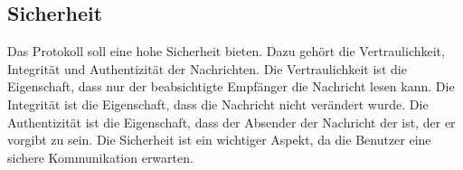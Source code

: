 \subsection{Sicherheit}

Das Protokoll soll eine hohe Sicherheit bieten. Dazu gehört die Vertraulichkeit, 
Integrität und Authentizität der Nachrichten. Die Vertraulichkeit ist die Eigenschaft, dass nur der
beabsichtigte Empfänger die Nachricht lesen kann. Die Integrität ist die Eigenschaft, dass 
die Nachricht nicht verändert wurde. Die Authentizität ist die Eigenschaft, dass der Absender 
der Nachricht der ist, der er vorgibt zu sein. Die Sicherheit ist ein wichtiger Aspekt, da die
Benutzer eine sichere Kommunikation erwarten.

